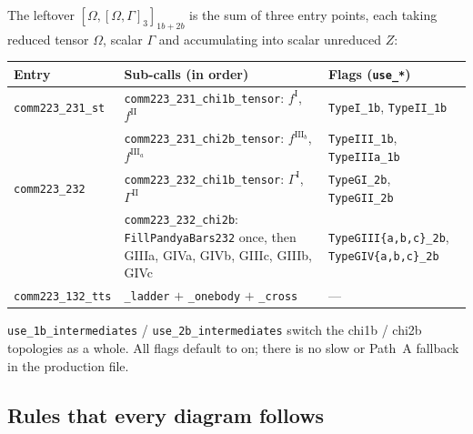 \documentclass[enabledeprecatedfontcommands]{scrartcl}
\newcommand{\codename}[1]{\texttt{#1}}
\begin{document}
The leftover $[\Omega,[\Omega,\Gamma]_3]_{1b+2b}$ is the sum of three entry
points, each taking reduced tensor $\Omega$, scalar $\Gamma$ and
accumulating into scalar unreduced $Z$:
\begin{center}
\small
\begin{tabular}{@{}p{}p{}p{}@{}}
\hline
Entry & Sub-calls (in order) & Flags (\codename{use\_*}) \\
\hline
\codename{comm223\_231\_st} &
  \codename{comm223\_231\_chi1b\_tensor}: $f^{\mathrm{I}}$, $f^{\mathrm{II}}$ &
  \codename{TypeI\_1b}, \codename{TypeII\_1b} \\
 & \codename{comm223\_231\_chi2b\_tensor}: $f^{\mathrm{III}_b}$, $f^{\mathrm{III}_a}$ &
  \codename{TypeIII\_1b}, \codename{TypeIIIa\_1b} \\
\codename{comm223\_232} &
  \codename{comm223\_232\_chi1b\_tensor}: $\Gamma^{\mathrm{I}}$, $\Gamma^{\mathrm{II}}$ &
  \codename{TypeGI\_2b}, \codename{TypeGII\_2b} \\
 & \codename{comm223\_232\_chi2b}: \codename{FillPandyaBars232} once, then
   GIIIa, GIVa, GIVb, GIIIc, GIIIb, GIVc &
  \codename{TypeGIII\{a,b,c\}\_2b}, \codename{TypeGIV\{a,b,c\}\_2b} \\
\codename{comm223\_132\_tts} &
  \codename{\_ladder} $+$ \codename{\_onebody} $+$ \codename{\_cross} & --- \\
\hline
\end{tabular}
\end{center}
\codename{use\_1b\_intermediates} / \codename{use\_2b\_intermediates}
switch the chi1b / chi2b topologies as a whole. All flags default to on;
there is no slow or Path~A fallback in the production file.

\subsection{Rules that every diagram follows}
\end{document}

